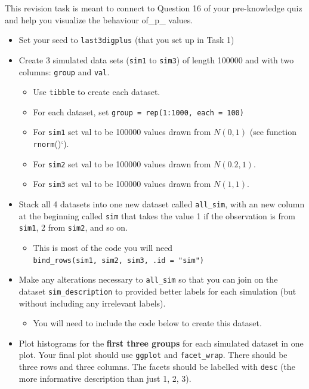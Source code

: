 \documentclass[
  openany]{book}
\providecommand{\tightlist}{%
  \setlength{\itemsep}{0pt}\setlength{\parskip}{0pt}}
\begin{document}
This revision task is meant to connect to Question 16 of your pre-knowledge quiz and help you visualize the behaviour of\_p\_ values.

\begin{itemize}
\tightlist
\item
  Set your seed to \texttt{last3digplus} (that you set up in Task 1)
\item
  Create 3 simulated data sets (\texttt{sim1} to \texttt{sim3}) of length 100000 and with two columns: \texttt{group} and \texttt{val}.

  \begin{itemize}
  \tightlist
  \item
    Use \texttt{tibble} to create each dataset.
  \item
    For each dataset, set \texttt{group\ =\ rep(1:1000,\ each\ =\ 100)}
  \item
    For \texttt{sim1} set val to be 100000 values drawn from \(N(0, 1)\) (see function \texttt{rnorm}()`).
  \item
    For \texttt{sim2} set val to be 100000 values drawn from \(N(0.2, 1)\).\\
  \item
    For \texttt{sim3} set val to be 100000 values drawn from \(N(1, 1)\).\\
  \end{itemize}
\item
  Stack all 4 datasets into one new dataset called \texttt{all\_sim}, with an new column at the beginning called \texttt{sim} that takes the value 1 if the observation is from \texttt{sim1}, 2 from \texttt{sim2}, and so on.

  \begin{itemize}
  \tightlist
  \item
    This is most of the code you will need \texttt{bind\_rows(sim1,\ sim2,\ sim3,\ .id\ =\ "sim")}
  \end{itemize}
\item
  Make any alterations necessary to \texttt{all\_sim} so that you can join on the dataset \texttt{sim\_description} to provided better labels for each simulation (but without including any irrelevant labels).

  \begin{itemize}
  \tightlist
  \item
    You will need to include the code below to create this dataset.
  \end{itemize}
\item
  Plot histograms for the \textbf{first three groups} for each simulated dataset in one plot. Your final plot should use \texttt{ggplot} and \texttt{facet\_wrap}. There should be three rows and three columns. The facets should be labelled with \texttt{desc} (the more informative description than just 1, 2, 3).


\end{itemize}
\end{document}
